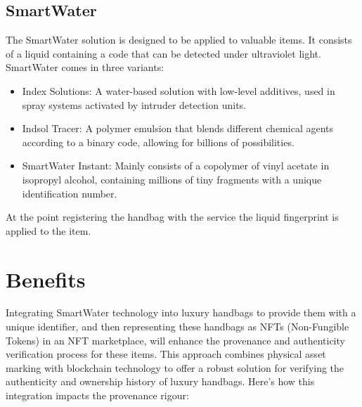 \documentclass{tufte-handout}
\begin{document}
\subsection{SmartWater}\label{sec:page-layout}
The SmartWater solution is designed to be applied to valuable items. It consists of a liquid containing a code that can be detected under
ultraviolet light. SmartWater comes in three variants:
\begin{itemize}
    \item Index Solutions: A water-based solution with low-level additives, used in spray systems activated by intruder detection units.
    \item Indsol Tracer: A polymer emulsion that blends different chemical agents according to a binary code, allowing for billions of possibilities.
    \item SmartWater Instant: Mainly consists of a copolymer of vinyl acetate in isopropyl alcohol, containing millions of tiny fragments with a unique
    identification number.
\end{itemize}
At the point registering the handbag with the service the liquid fingerprint is applied to the item.

\section{Benefits}\label{sec:page-layout}
Integrating SmartWater technology into luxury handbags to provide them with a unique identifier, and then representing these handbags as NFTs
(Non-Fungible Tokens) in an NFT marketplace, will enhance the provenance and authenticity verification process for these items.
This approach combines physical asset marking with blockchain technology to offer a robust solution for verifying the authenticity and
ownership history of luxury handbags. Here's how this integration impacts the provenance rigour:
\end{document}
